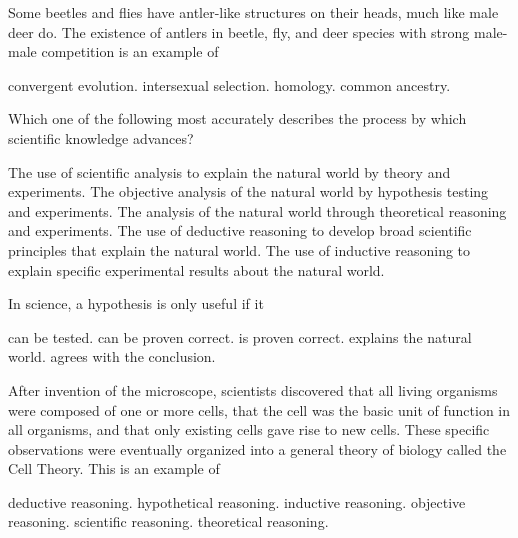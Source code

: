\question
Some beetles and flies have antler-like structures on their heads, much like male deer do. The existence of antlers in beetle, fly, and deer species with strong male-male competition is an example of 

\begin{choices}
\correctchoice convergent evolution. %
\choice intersexual selection. %
\choice homology. %
\choice common ancestry. %
\end{choices}


\question
Which one of the following most accurately describes the process by which scientific knowledge advances? 

\begin{choices}
\choice The use of scientific analysis to explain the natural world by theory and experiments.%
\correctchoice The objective analysis of the natural world by hypothesis testing and experiments.%
\choice The analysis of the natural world through theoretical reasoning and experiments.%
\choice The use of deductive reasoning to develop broad scientific principles that explain the natural world.%
\choice The use of inductive reasoning to explain specific experimental results about the natural world.%
\end{choices}


\question
In science, a hypothesis is only useful if it

\begin{choices}
\correctchoice can be tested.%
\choice can be proven correct.%
\choice is proven correct.%
\choice explains the natural world.%
\choice agrees with the conclusion.%
\end{choices}

\question
After invention of the microscope, scientists discovered that all living organisms were composed of one or more cells, that the cell was the basic unit of function in all organisms, and that only existing cells gave rise to new cells. These specific observations were eventually organized into a general theory of biology called the Cell Theory. This is an example of 

\begin{choices}
\choice deductive reasoning.%
\choice hypothetical reasoning.%
\correctchoice inductive reasoning.%
\choice objective reasoning.%
\choice scientific reasoning.%
\choice theoretical reasoning.%
\end{choices}

